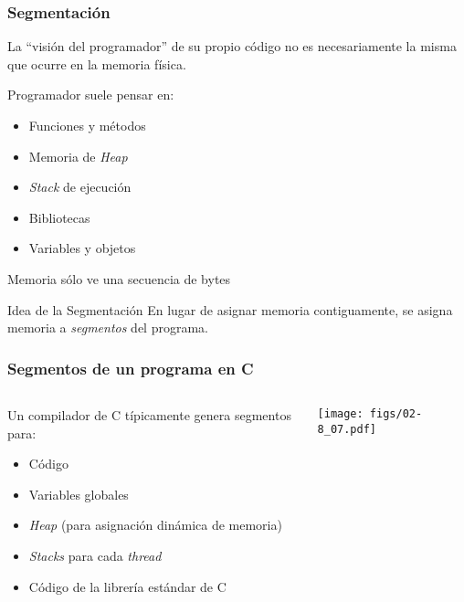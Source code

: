 \documentclass[letter]{beamer}
\begin{document}
\begin{frame}
  \frametitle{Segmentación}
  
  La ``visión del programador'' de su propio código no es necesariamente la misma
  que ocurre en la memoria física.
  
  Programador suele pensar en:
  \begin{itemize}
    \item Funciones y métodos
    \item Memoria de {\em Heap}
    \item {\em Stack} de ejecución
    \item Bibliotecas
    \item Variables y objetos
  \end{itemize}
  
  Memoria sólo ve una secuencia de bytes
  
  \begin{block}{Idea de la Segmentación}
    En lugar de asignar memoria contiguamente, se asigna memoria a {\em segmentos} del programa.
  \end{block}
\end{frame}

\begin{frame}
  \frametitle{Segmentos de un programa en C}

  \begin{columns}[c]
    \begin{column}[T]{7cm}
      Un compilador de C típicamente genera segmentos para:
      \begin{itemize}
        \item Código
        \item Variables globales
        \item {\em Heap} (para asignación dinámica de memoria)
        \item {\em Stacks} para cada {\em thread}
        \item Código de la librería estándar de C
      \end{itemize}
    \end{column}
    
    \begin{column}[T]{4cm}
      \begin{center}
        \texttt{[image: figs/02-8\_07.pdf]}
      \end{center}
    \end{column}
  \end{columns}
  
\end{frame}
\end{document}
